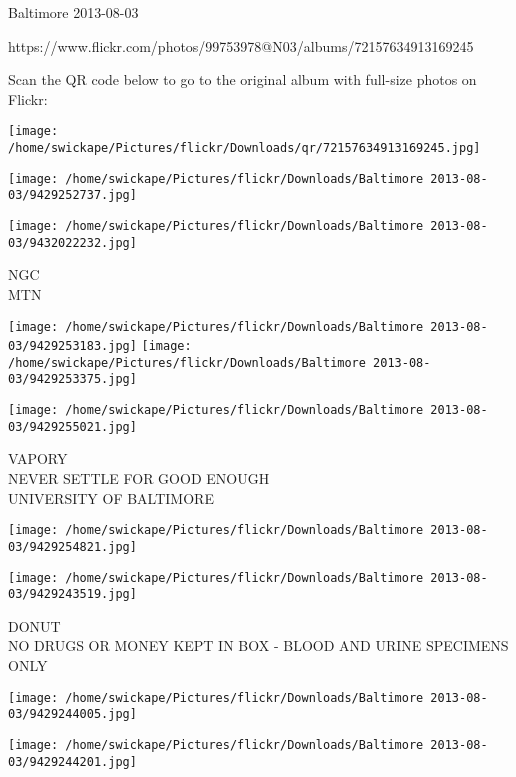 \documentclass[10pt,letterpaper]{article}
\begin{document}
Baltimore 2013-08-03

https://www.flickr.com/photos/99753978@N03/albums/72157634913169245

Scan the QR code below to go to the original album with full-size photos on Flickr:

\texttt{[image: /home/swickape/Pictures/flickr/Downloads/qr/72157634913169245.jpg]}
\pagebreak

\texttt{[image: /home/swickape/Pictures/flickr/Downloads/Baltimore 2013-08-03/9429252737.jpg]}

\vspace{0.25in}
\texttt{[image: /home/swickape/Pictures/flickr/Downloads/Baltimore 2013-08-03/9432022232.jpg]}

NGC\\
MTN\\
\pagebreak

\texttt{[image: /home/swickape/Pictures/flickr/Downloads/Baltimore 2013-08-03/9429253183.jpg]}
\texttt{[image: /home/swickape/Pictures/flickr/Downloads/Baltimore 2013-08-03/9429253375.jpg]}

\vspace{0.25in}
\texttt{[image: /home/swickape/Pictures/flickr/Downloads/Baltimore 2013-08-03/9429255021.jpg]}

VAPORY\\
NEVER SETTLE FOR GOOD ENOUGH\\
UNIVERSITY OF BALTIMORE\\
\pagebreak

\texttt{[image: /home/swickape/Pictures/flickr/Downloads/Baltimore 2013-08-03/9429254821.jpg]}

\vspace{0.25in}
\texttt{[image: /home/swickape/Pictures/flickr/Downloads/Baltimore 2013-08-03/9429243519.jpg]}

DONUT\\
NO DRUGS OR MONEY KEPT IN BOX {-} BLOOD AND URINE SPECIMENS ONLY\\
\pagebreak

\texttt{[image: /home/swickape/Pictures/flickr/Downloads/Baltimore 2013-08-03/9429244005.jpg]}

\vspace{0.25in}
\texttt{[image: /home/swickape/Pictures/flickr/Downloads/Baltimore 2013-08-03/9429244201.jpg]}
\end{document}
